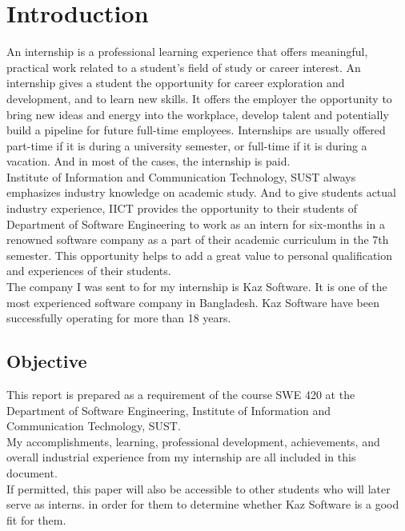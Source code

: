 \chapter{Introduction}

An internship is a professional learning experience that offers meaningful, practical work related to a student’s field of study or career interest.
An internship gives a student the opportunity for career exploration and development, and to learn new skills.
It offers the employer the opportunity to bring new ideas and energy into the workplace, develop talent and potentially build a pipeline for future full-time employees.
Internships are usually offered part-time if it is during a university semester, or full-time if it is during a vacation.
And in most of the cases, the internship is paid. \\

Institute of Information and Communication Technology, SUST always emphasizes industry knowledge on academic study. 
And to give students actual industry experience, IICT provides the opportunity to their students of Department of Software Engineering to work as an intern for six-months in a renowned software company as a part of their academic curriculum in the 7th semester.
This opportunity helps to add a great value to personal qualification and experiences of their students. \\

The company I was sent to for my internship is Kaz Software. It is one of the most experienced software company in Bangladesh. Kaz Software have been successfully operating for more than 18 years.

\section{Objective}

This report is prepared as a requirement of the course SWE 420 at the Department of Software Engineering, Institute of Information and Communication Technology, SUST.\\

My accomplishments, learning, professional development, achievements, and overall industrial experience from my internship are all included in this document.\\

If permitted, this paper will also be accessible to other students who will later serve as interns. in order for them to determine whether Kaz Software is a good fit for them.

